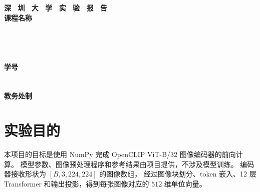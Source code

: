 \documentclass[a4paper,12pt]{article}
\begin{document}
\begin{titlepage}
  \centering
  \vspace*{2cm}
  \Huge{\textbf{深 \ 圳 \ 大 \ 学 \ 实 \ 验  \ 报 \ 告}}\\[1.5cm]

  {\Large\textbf{课程名称}\quad\underline{}}\\[0.5cm]
  {\Large
  \noindent{}
  \underline{}}\\[0.5cm]
  {\Large
  \noindent{}
  \underline{}}\\[0.5cm]
  {\Large
  \noindent{}
  \underline{}}\\[0.5cm]
  {\Large
  \noindent{}
  \underline{}}\\[0.5cm]
  {\Large
  \noindent{}
  \underline{}
  \hspace{0.5cm}
  \textbf{学号}
  \underline{}}\\[0.5cm]
  {\Large
  \noindent{}
  \underline{}}\\[0.5cm]
  {\Large
  \noindent{}
  \underline{}}\\[1.5cm]

  \vfill
  \Large{\textbf{教务处制}}
\end{titlepage}

\newpage
{}



\section{实验目的}

本项目的目标是使用 NumPy 完成 OpenCLIP ViT-B/32 图像编码器的前向计算。
模型参数、图像预处理程序和参考结果由项目提供，不涉及模型训练。
编码器接收形状为 $[B,3,224,224]$ 的图像数组，
经过图像块划分、token 嵌入、12 层 Transformer 和输出投影，得到每张图像对应的 $512$ 维单位向量。
\end{document}
